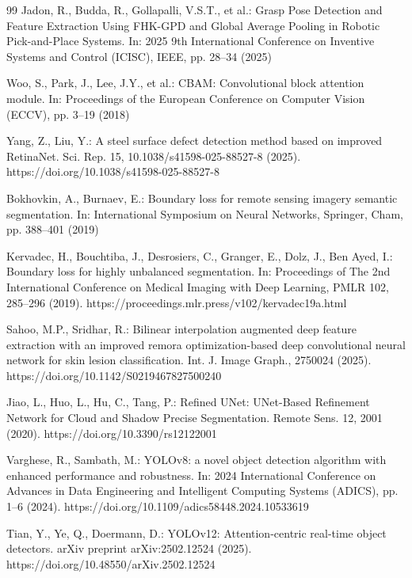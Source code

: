 \documentclass[sn-basic]{sn-jnl}
\theoremstyle{thmstyleone}%
\theoremstyle{thmstyletwo}%
\theoremstyle{thmstylethree}%
\begin{document}
\begin{thebibliography}{99}
 Jadon, R., Budda, R., Gollapalli, V.S.T., et al.: Grasp Pose Detection and Feature Extraction Using FHK-GPD and Global Average Pooling in Robotic Pick-and-Place Systems. In: 2025 9th International Conference on Inventive Systems and Control (ICISC), IEEE, pp. 28–34 (2025)

 Woo, S., Park, J., Lee, J.Y., et al.: CBAM: Convolutional block attention module. In: Proceedings of the European Conference on Computer Vision (ECCV), pp. 3–19 (2018)

 Yang, Z., Liu, Y.: A steel surface defect detection method based on improved RetinaNet. Sci. Rep. 15, 10.1038/s41598-025-88527-8 (2025). https://doi.org/10.1038/s41598-025-88527-8


 Bokhovkin, A., Burnaev, E.: Boundary loss for remote sensing imagery semantic segmentation. In: International Symposium on Neural Networks, Springer, Cham, pp. 388–401 (2019)

 Kervadec, H., Bouchtiba, J., Desrosiers, C., Granger, E., Dolz, J., Ben Ayed, I.: Boundary loss for highly unbalanced segmentation. In: Proceedings of The 2nd International Conference on Medical Imaging with Deep Learning, PMLR 102, 285–296 (2019). https://proceedings.mlr.press/v102/kervadec19a.html

 Sahoo, M.P., Sridhar, R.: Bilinear interpolation augmented deep feature extraction with an improved remora optimization-based deep convolutional neural network for skin lesion classification. Int. J. Image Graph., 2750024 (2025). https://doi.org/10.1142/S0219467827500240

 Jiao, L., Huo, L., Hu, C., Tang, P.: Refined UNet: UNet-Based Refinement Network for Cloud and Shadow Precise Segmentation. Remote Sens. 12, 2001 (2020). https://doi.org/10.3390/rs12122001

 Varghese, R., Sambath, M.: YOLOv8: a novel object detection algorithm with enhanced performance and robustness. In: 2024 International Conference on Advances in Data Engineering and Intelligent Computing Systems (ADICS), pp. 1–6 (2024). https://doi.org/10.1109/adics58448.2024.10533619

 Tian, Y., Ye, Q., Doermann, D.: YOLOv12: Attention-centric real-time object detectors. arXiv preprint arXiv:2502.12524 (2025). https://doi.org/10.48550/arXiv.2502.12524


\end{thebibliography}
\end{document}
